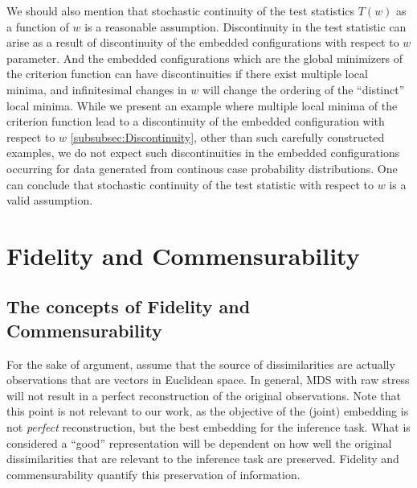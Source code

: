 \documentclass[12pt,oneside,final]{thesis}
\begin{document}
We should also mention that stochastic continuity of the test statistics $T(w)$ as a function of $w$  is a reasonable assumption. Discontinuity in the test statistic can arise as  a result of discontinuity of the embedded configurations with respect to $w$ parameter. And the embedded configurations which are the global minimizers of the criterion function can have discontinuities if  there exist multiple local minima, and  infinitesimal changes in $w$ will change the ordering of the ``distinct'' local minima. While  we present an example where multiple local minima of the criterion function  lead to  a discontinuity of the embedded configuration  with respect to $w$ \ref{subsubsec:Discontinuity}, other than such carefully constructed examples, we do not expect  such discontinuities in the embedded configurations occurring for data generated from continous case probability distributions. 
One can conclude  that stochastic continuity of the test statistic with respect to $w$  is a valid assumption.




\chapter{Fidelity and Commensurability}
\label{chap:FidComm}

\section{The concepts of  Fidelity and Commensurability\label{chap:FidComm}}

For the sake of argument, assume that the source of dissimilarities  are actually observations that are vectors in  Euclidean space. In general, MDS with raw stress will not result in a perfect reconstruction  of the original observations.
 Note that this point is not relevant to our work, as   the objective of the (joint) embedding is not \emph{perfect} reconstruction, but the best embedding for the inference task. What is considered a ``good''  representation will be dependent on how well the original dissimilarities that are relevant to the inference task are preserved. Fidelity and commensurability quantify this preservation of information.
\end{document}
